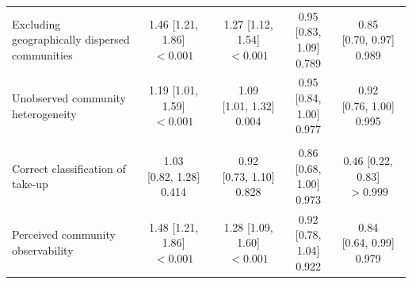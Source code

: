 \begin{tabular}[t]{lcccc}
\hspace{1em}Excluding geographically dispersed communities & \makecell[c]{1.46\\{[1.21, 1.86]}\\$<0.001$} & \makecell[c]{1.27\\{[1.12, 1.54]}\\$<0.001$} & \makecell[c]{0.95\\{[0.83, 1.09]}\\0.789} & \makecell[c]{0.85\\{[0.70, 0.97]}\\0.989}\\
\hspace{1em}Unobserved community heterogeneity & \makecell[c]{1.19\\{[1.01, 1.59]}\\$<0.001$} & \makecell[c]{1.09\\{[1.01, 1.32]}\\0.004} & \makecell[c]{0.95\\{[0.84, 1.00]}\\0.977} & \makecell[c]{0.92\\{[0.76, 1.00]}\\0.995}\\
\addlinespace[0.3em]
\multicolumn{5}{l}{\textit{Measurement of observability}}\\
\hspace{1em}Correct classification of take-up & \makecell[c]{1.03\\{[0.82, 1.28]}\\0.414} & \makecell[c]{0.92\\{[0.73, 1.10]}\\0.828} & \makecell[c]{0.86\\{[0.68, 1.00]}\\0.973} & \makecell[c]{0.46\\{[0.22, 0.83]}\\$>0.999$}\\
\hspace{1em}Perceived community observability & \makecell[c]{1.48\\{[1.21, 1.86]}\\$<0.001$} & \makecell[c]{1.28\\{[1.09, 1.60]}\\$<0.001$} & \makecell[c]{0.92\\{[0.78, 1.04]}\\0.922} & \makecell[c]{0.84\\{[0.64, 0.99]}\\0.979}\\

\end{tabular}
